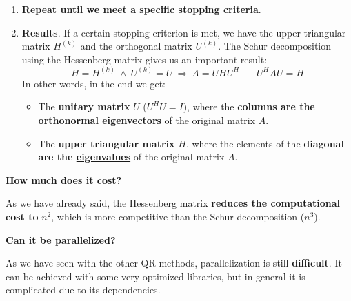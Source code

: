 \begin{enumerate}
    \item \textbf{Repeat until we meet a specific stopping criteria}.
    
    \item \textbf{Results}. If a certain stopping criterion is met, we have the upper triangular matrix $H^{\left(k\right)}$ and the orthogonal matrix $U^{\left(k\right)}$. The Schur decomposition using the Hessenberg matrix gives us an important result:
    \begin{equation*}
        H = H^{\left(k\right)} \: \land \: U^{\left(k\right)} = U \: \Longrightarrow \: A = U H U^{H} \: \equiv \: U^{H} A U = H
    \end{equation*}
    In other words, in the end we get:
    \begin{itemize}
        \item The \textbf{unitary matrix} $U$ ($U^{H}U = I$), where the \textbf{columns are the orthonormal \underline{eigenvectors}} of the original matrix $A$.
        
        \item The \textbf{upper triangular matrix} $H$, where the elements of the \textbf{diagonal are the \underline{eigenvalues}} of the original matrix $A$.
    \end{itemize}
\end{enumerate}

\highspace
\begin{flushleft}
    \textcolor{Red2}{ \textbf{How much does it cost?}}
\end{flushleft}
As we have already said, the Hessenberg matrix \textbf{reduces the computational cost to} $n^{2}$, which is more competitive than the Schur decomposition ($n^{3}$).

\highspace
\begin{flushleft}
    \textcolor{Green3}{ \textbf{Can it be parallelized?}}
\end{flushleft}
As we have seen with the other QR methods, parallelization is still \textbf{difficult}. It can be achieved with some very optimized libraries, but in general it is complicated due to its dependencies.